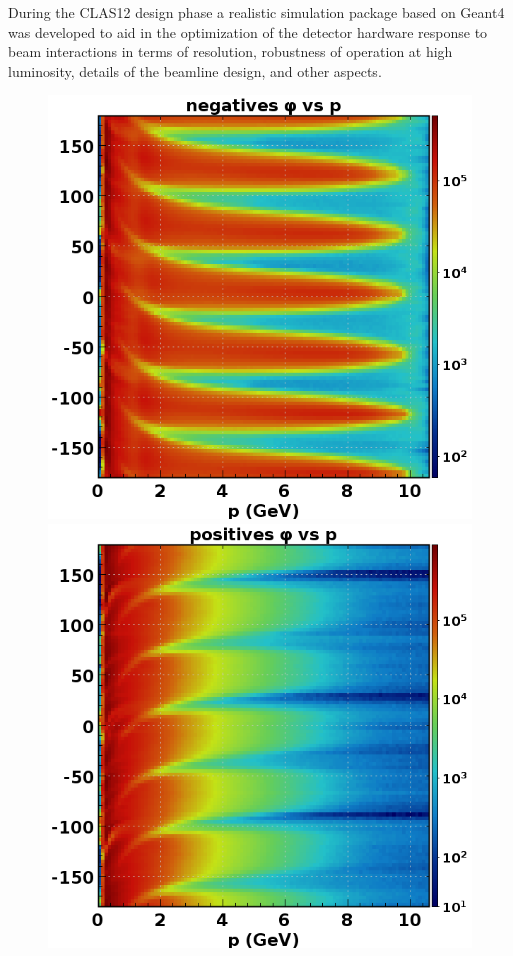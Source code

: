 \documentclass[final,3p,twocolumn]{elsarticle}
\begin{document}
During the CLAS12 design phase a realistic simulation package based on Geant4 was developed to aid in the
optimization of the detector hardware response to beam interactions in terms of resolution, robustness of operation
at high luminosity, details of the beamline design, and other aspects. 

\begin{figure}[h!]
\vspace{0.5cm}%
\centerline{\includegraphics[width=0.85\columnwidth]{neg_phi_p.png}
\hspace{1cm}\includegraphics[width=0.85\columnwidth]{pos_phi_p.png}}

\end{figure}
\end{document}
